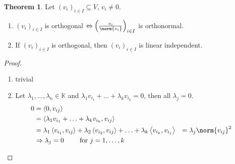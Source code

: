 \documentclass[a4paper,landscape,twocolumn]{article}
\newcommand\functional[1]{\left\langle{#1}\right\rangle}
\theoremstyle{definition}
\newtheorem{theorem}{Theorem}
\DeclarePairedDelimiter\norm\lVert\rVert
\begin{document}
\begin{theorem}
  \label{satz-8.38}
  Let $(v_i)_{i \in I} \subseteq V$, $v_i \neq 0$.
  \begin{enumerate}
    \item $(v_i)_{i \in I}$ is orthogonal $\Leftrightarrow \left(\frac{v_i}{\norm{v_i}}\right)_{i \in I}$ is orthonormal.
    \item If $(v_i)_{i \in I}$ is orthogonal, then $(v_i)_{i \in I}$ is linear independent.
  \end{enumerate}
\end{theorem}
\begin{proof}
  \begin{enumerate}
    \item trivial
    \item Let $\lambda_1, \ldots, \lambda_n \in \mathbb K$ and $\lambda_1 v_{i_1} + \ldots + \lambda_k v_{i_k} = 0$,
      then all $\lambda_j = 0$.
      \begin{align*}
        0
        &= \functional{0, v_{ij}} \\
        &= \functional{\lambda_1 v_{i_1} + \ldots + \lambda_k v_{i_k}, v_{ij}} \\
        &= \lambda_1 \functional{v_{i_1}, v_{ij}} + \lambda_2 \functional{v_{i_2}, v_{ij}} + \ldots + \lambda_k \functional{v_{i_k}, v_{i_j}}
        &= \lambda_j \norm{v_{ij}}^2 \\
        &\Rightarrow \lambda_j = 0 \qquad \text{ for } j = 1, \ldots, k
      \end{align*}
  \end{enumerate}
\end{proof}
\end{document}

